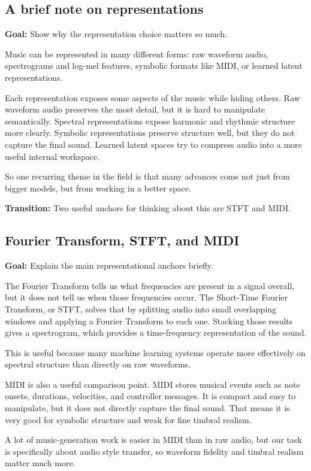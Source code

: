 \documentclass[11pt]{article}
\begin{document}
\subsection*{A brief note on representations}
\textbf{Goal:} Show why the representation choice matters so much.

Music can be represented in many different forms: raw waveform audio, spectrograms and log-mel features, symbolic formats like MIDI, or learned latent representations.

Each representation exposes some aspects of the music while hiding others. Raw waveform audio preserves the most detail, but it is hard to manipulate semantically. Spectral representations expose harmonic and rhythmic structure more clearly. Symbolic representations preserve structure well, but they do not capture the final sound. Learned latent spaces try to compress audio into a more useful internal workspace.

So one recurring theme in the field is that many advances come not just from bigger models, but from working in a better space.

\textbf{Transition:} Two useful anchors for thinking about this are STFT and MIDI.

\subsection*{Fourier Transform, STFT, and MIDI}
\textbf{Goal:} Explain the main representational anchors briefly.

The Fourier Transform tells us what frequencies are present in a signal overall, but it does not tell us when those frequencies occur. The Short-Time Fourier Transform, or STFT, solves that by splitting audio into small overlapping windows and applying a Fourier Transform to each one. Stacking those results gives a spectrogram, which provides a time-frequency representation of the sound.

This is useful because many machine learning systems operate more effectively on spectral structure than directly on raw waveforms.

MIDI is also a useful comparison point. MIDI stores musical events such as note onsets, durations, velocities, and controller messages. It is compact and easy to manipulate, but it does not directly capture the final sound. That means it is very good for symbolic structure and weak for fine timbral realism.

A lot of music-generation work is easier in MIDI than in raw audio, but our task is specifically about audio style transfer, so waveform fidelity and timbral realism matter much more.
\end{document}

